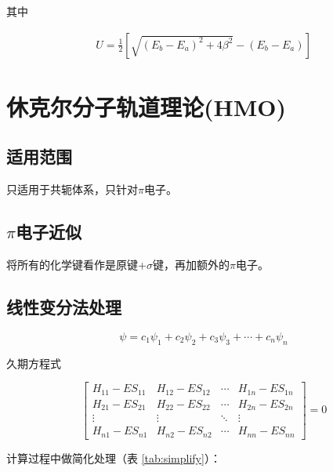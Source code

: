 其中

\begin{align*}
    U = \frac{1}{2} \left[ \sqrt{ \left(E_b - E_a\right)^2 + 4\beta^2} - \left(E_b - E_a\right) \right]
\end{align*}

\section{休克尔分子轨道理论(HMO)}

\subsection{适用范围}

只适用于共轭体系，只针对$\pi$电子。

\subsection{$\pi$电子近似}

将所有的化学键看作是原键+$\sigma$键，再加额外的$\pi$电子。


\subsection{线性变分法处理}


\begin{equation*}
    \psi = c_1 \psi_1 + c_2 \psi_2 + c_3 \psi_3 + \cdots + c_n \psi_n
\end{equation*}

久期方程式

\begin{equation*}
    \begin{bmatrix*}
        H_{11} - ES_{11} & H_{12} - ES_{12} & \cdots & H_{1n} - ES_{1n} \\
        H_{21} - ES_{21} & H_{22} - ES_{22} & \cdots & H_{2n} - ES_{2n} \\
        \vdots & \vdots & \ddots & \vdots \\
        H_{n1} - ES_{n1} & H_{n2} - ES_{n2} & \cdots & H_{nn} - ES_{nn}
    \end{bmatrix*} = 0
\end{equation*}

计算过程中做简化处理（表 \ref{tab:simplify}）：


